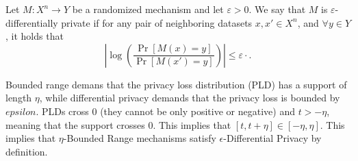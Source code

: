 \documentclass{article}
\begin{document}
\begin{definition}
\label{def:dp}
    Let $M : X^n \to Y$ be a randomized mechanism and let $\varepsilon > 0$. 
    We say that $M$ is $\varepsilon$-differentially private if for any pair of neighboring datasets 
    $x, x' \in X^n$, and $\forall y \in Y$, it holds that
    \begin{equation}
      \left| \log \left( \frac{\Pr[M(x) = y]}{\Pr[M(x') = y]} \right) \right| \leq \varepsilon \cdot.
    \end{equation}
\end{definition}
  

Bounded range demans that the privacy loss distribution (PLD) has a support of length $\eta$, while differential privacy demands that the privacy loss is bounded by $epsilon$.
PLDs cross 0 (they cannot be only positive or negative) and $t > -\eta$, meaning that the support crosses 0. This implies that $\left[t, t+\eta\right] \in \left[-\eta, \eta\right]$. This implies that $\eta$-Bounded Range mechanisms satisfy $\epsilon$-Differential Privacy by definition.
\end{document}
